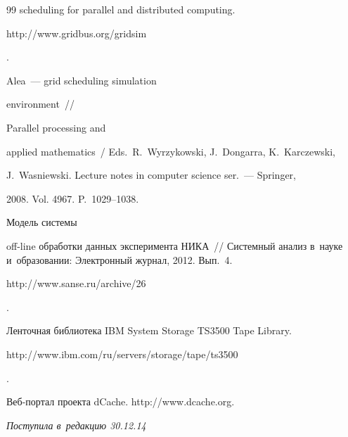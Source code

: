 {{\begin{thebibliography}{99}
scheduling for parallel and distributed computing. {\sf


http://www.gridbus.org/gridsim}.




 Alea~--- grid scheduling simulation


environment~/\!\!/


Parallel processing and


applied mathematics~/ Eds.\ R.~Wyrzykowski, J.~Dongarra, K.~Karczewski,


J.~Wasniewski. Lecture notes in computer science ser.~--- Springer,


2008.   Vol. 4967. P.~1029--1038.




 Модель системы


off-line обработки данных эксперимента НИКА~/\!\!/ Системный анализ в~науке и~образовании: Электронный журнал, 2012. Вып.~4. {\sf


http://www.sanse.ru/archive/26}.




Ленточная библиотека IBM System Storage TS3500 Tape Library. {\sf


http://www.ibm.com/ru/servers/storage/tape/ts3500}.




Веб-портал проекта dCache. {\sf http://www.dcache.org}.





\end{thebibliography}


} }













\hfill{\small\textit{Поступила в~редакцию 30.12.14}}














\vspace*{9pt}






